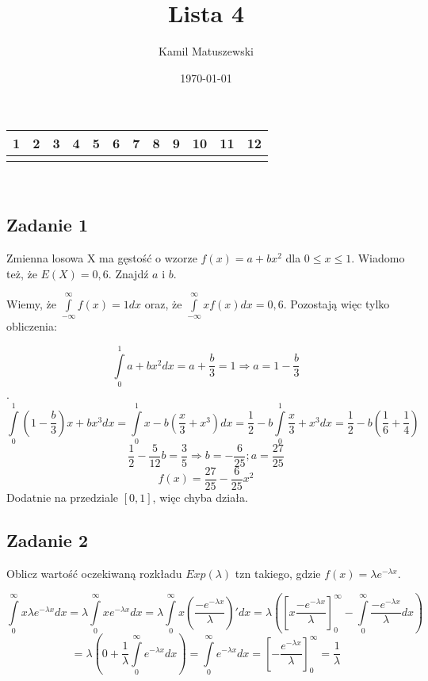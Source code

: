 \documentclass[a4paper]{article}
\title{Lista 4}
\author{Kamil Matuszewski}
\date{\today}
\begin{document}
\maketitle
\setlength{\parindent}{0.5ex}
\setlength{\parskip}{1.5ex}
\newcommand{\R}{\mathbb{R}}
\newcommand{\N}{\mathbb{N}}


\begin{center}
\begin{tabular}{|c *{10}{|c} |c|} & 2 & 3 & 4 & 5 & 6 & 7 & 8 & 9 & 10 & 11 & 12\\
\hline 
 & & & & & & & & & & & \\
\hline
\end{tabular}\\
\end{center}

\subsection*{Zadanie 1}
Zmienna losowa X ma gęstość o wzorze $f(x)=a+bx^2$ dla $0\leq x\leq 1$. Wiadomo też, że $E(X)=0,6$. Znajdź $a$ i $b$.

Wiemy, że $\int\limits_{-\infty}^\infty f(x) = 1 dx$ oraz, że $\int\limits_{-\infty}^\infty xf(x) dx = 0,6$. Pozostają więc tylko obliczenia:

$$\int\limits_0^1 a+bx^2 dx = a + \frac{b}{3} = 1 \Rightarrow a=1-\frac{b}{3}$$.
$$\int\limits_0^1 (1-\frac{b}{3})x+bx^3 dx = \int\limits_0^1 x-b(\frac{x}{3}+x^3) dx = \frac{1}{2}-b\int\limits_0^1 \frac{x}{3}+x^3 dx = \frac{1}{2}-b(\frac{1}{6}+\frac{1}{4} )$$
$$\frac{1}{2}-\frac{5}{12}b = \frac{3}{5} \Rightarrow b=-\frac{6}{25}; a=\frac{27}{25}$$
$$f(x)=\frac{27}{25}-\frac{6}{25}x^2 $$
Dodatnie na przedziale $[0,1]$, więc chyba działa.

\subsection*{Zadanie 2}
Oblicz wartość oczekiwaną rozkładu $Exp(\lambda)$ tzn takiego, gdzie $f(x)=\lambda e^{-\lambda x}$.

$$\int\limits_0^\infty x \lambda e^{-\lambda x} dx = \lambda \int\limits_0^\infty x e^{-\lambda x} dx = \lambda \int\limits_0^\infty x \left( \frac{-e^{-\lambda x}}{\lambda}\right)' dx = \lambda \left( \left[ x\frac{-e^{-\lambda x}}{\lambda} \right]_0^\infty - \int\limits_0^\infty \frac{-e^{-\lambda x}}{\lambda} dx \right)$$
$$= \lambda \left( 0 + \frac{1}{\lambda} \int\limits_0^\infty e^{-\lambda x} dx \right)= \int\limits_0^\infty e^{-\lambda x} dx = \left[ -\frac{e^{-\lambda x}}{\lambda}\right]_0^\infty = \frac{1}{\lambda}$$
\end{document}
